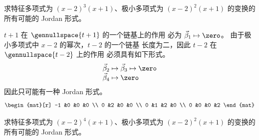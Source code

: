   \recommended \item
    求特征多项式为 \( (x-2)^3(x+1) \)、极小多项式为
    \( (x-2)^2(x+1) \) 的变换的所有可能的 Jordan 形式。
    \begin{answer}
      $t+1$ 在 $\gennullspace{t+1}$ 的一个链基上的作用
      必为 $\vec{\beta}_1\mapsto\zero$。 
      由于极小多项式中 \( x-2 \) 的幂次，$t-2$ 的一个链基
      长度为二，因此
      \( t-2 \) 在 \( \gennullspace{t-2} \) 上的作用
      必须具有如下形式。
      \begin{equation*}
        \begin{array}[t]{l}
          \vec{\beta}_2\mapsto\vec{\beta}_3\mapsto\zero  \\
          \vec{\beta}_4\mapsto\zero 
        \end{array}        
      \end{equation*}
      因此只可能有一种 Jordan 形式。
      \begin{equation*}
          \begin{mat}[r]
            -1  &0  &0  &0  \\
             0  &2  &0  &0  \\
             0  &1  &2  &0  \\
             0  &0  &0  &2
          \end{mat}
       \end{equation*}
      \end{answer}
  \item 
    求特征多项式为 \( (x-2)^4(x+1) \)、极小多项式为
    \( (x-2)^2(x+1) \) 的变换的所有可能的 Jordan 形式。
